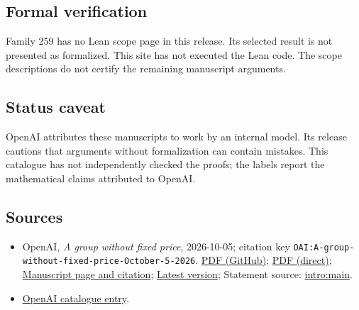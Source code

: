 \documentclass[11pt]{article}
\begin{document}
\subsection{Formal verification}
Family 259 has no Lean scope page in this release. Its selected result is not presented as formalized. This site has not executed the Lean code. The scope descriptions do not certify the remaining manuscript arguments.

\subsection{Status caveat}
OpenAI attributes these manuscripts to work by an internal model. Its release cautions that arguments without formalization can contain mistakes. This catalogue has not independently checked the proofs; the labels report the mathematical claims attributed to OpenAI.

\subsection{Sources}
\begin{itemize}
\item OpenAI, \emph{A group without fixed price}, 2026-10-05; citation key \texttt{OAI:A-group-without-fixed-price-October-5-2026}. \href{https://github.com/openai/math/blob/adc7f1241b42e322a6451854ab7e4b4c146bf78a/preprints/A-group-without-fixed-price-October-5-2026/unequal-costs-rank-100-amalgam.pdf}{PDF (GitHub)}; \href{https://github.com/openai/math/raw/adc7f1241b42e322a6451854ab7e4b4c146bf78a/preprints/A-group-without-fixed-price-October-5-2026/unequal-costs-rank-100-amalgam.pdf}{PDF (direct)}; \href{https://github.com/openai/math/blob/adc7f1241b42e322a6451854ab7e4b4c146bf78a/preprints/A-group-without-fixed-price-October-5-2026/README.md}{Manuscript page and citation}; \href{https://github.com/openai/math/blob/main/preprints/A-group-without-fixed-price-October-5-2026/unequal-costs-rank-100-amalgam.pdf}{Latest version}; Statement source: \href{https://github.com/openai/math/blob/adc7f1241b42e322a6451854ab7e4b4c146bf78a/preprints/A-group-without-fixed-price-October-5-2026/build/introduction.tex\#L63}{intro:main}.
\item \href{https://github.com/openai/math/blob/adc7f1241b42e322a6451854ab7e4b4c146bf78a/CONTENTS.md}{OpenAI catalogue entry}.
\end{itemize}
\end{document}
